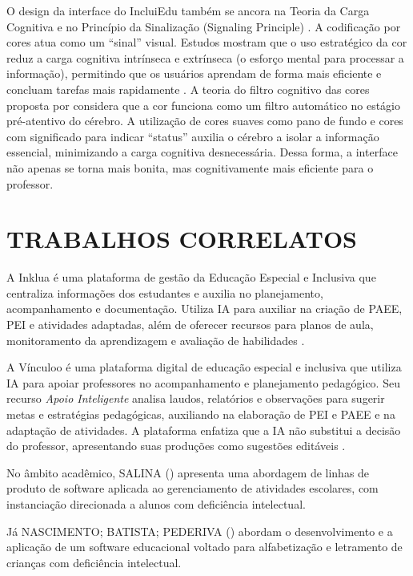 O design da interface do IncluiEdu também se ancora na Teoria da Carga Cognitiva \cite{sweller1988cognitive} e no Princípio da Sinalização (Signaling Principle) \cite{mayer2005signaling}. A codificação por cores atua como um “sinal” visual. Estudos mostram que o uso estratégico da cor reduz a carga cognitiva intrínseca e extrínseca (o esforço mental para processar a informação), permitindo que os usuários aprendam de forma mais eficiente e concluam tarefas mais rapidamente \cite{tabora2026systematic,huang2025web}. A teoria do filtro cognitivo das cores proposta por  considera que a cor funciona como um filtro automático no estágio pré-atentivo do cérebro. A utilização de cores suaves como pano de fundo e cores com significado para indicar “status” auxilia o cérebro a isolar a informação essencial, minimizando a carga cognitiva desnecessária. Dessa forma, a interface não apenas se torna mais bonita, mas cognitivamente mais eficiente para o professor.

\section{TRABALHOS CORRELATOS}
\label{trabalhos_correlatos}
A Inklua é uma plataforma de gestão da Educação Especial e Inclusiva que centraliza informações dos estudantes e auxilia no planejamento, acompanhamento e documentação. Utiliza IA para auxiliar na criação de PAEE, PEI e atividades adaptadas, além de oferecer recursos para planos de aula, monitoramento da aprendizagem e avaliação de habilidades \cite{inklua2026}.

A Vínculoo é uma plataforma digital de educação especial e inclusiva que utiliza IA para apoiar professores no acompanhamento e planejamento pedagógico. Seu recurso \textit{Apoio Inteligente} analisa laudos, relatórios e observações para sugerir metas e estratégias pedagógicas, auxiliando na elaboração de PEI e PAEE e na adaptação de atividades. A plataforma enfatiza que a IA não substitui a decisão do professor, apresentando suas produções como sugestões editáveis \cite{vinculoo2026}.

No âmbito acadêmico, SALINA (\citeyear{salina2022lps}) apresenta uma abordagem de linhas de produto de software aplicada ao gerenciamento de atividades escolares, com instanciação direcionada a alunos com deficiência intelectual.

Já NASCIMENTO; BATISTA; PEDERIVA (\citeyear{nascimento2024software}) abordam o desenvolvimento e a aplicação de um software educacional voltado para alfabetização e letramento de crianças com deficiência intelectual.

